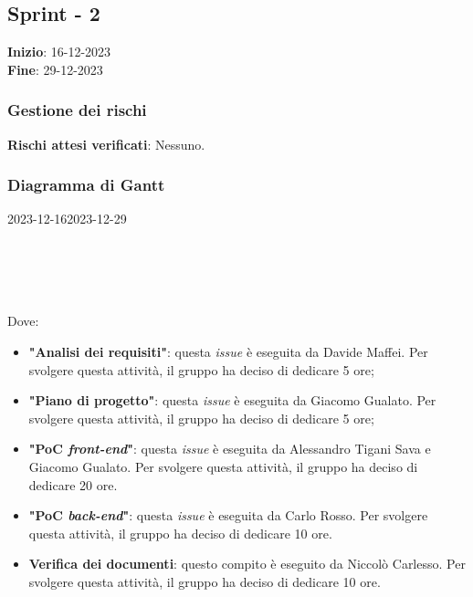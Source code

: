 \subsection{Sprint - 2}
\textbf{Inizio}: 16-12-2023 \\
\textbf{Fine}: 29-12-2023

\subsubsection{Gestione dei rischi}
\textbf{Rischi attesi verificati}: Nessuno.

\subsubsection{Diagramma di Gantt}

\begin{ganttchart}[
		x unit=0.6cm, %
		y unit chart=0.6cm,
		bar/.style={fill=blue!50},
		bar height=0.5,
		time slot format=isodate,
		time slot unit=day,
		vgrid,
		today=2023-12-16,
		today rule/.style={draw=red, ultra thick}
	]{2023-12-16}{2023-12-29}
	 \\
	 \\
	 \\
	 \\
	 \\
\end{ganttchart}

Dove:
\begin{itemize}
	\item \textbf{"Analisi dei requisiti"}: questa \textit{issue} è eseguita da
	      Davide Maffei. Per svolgere questa attività, il gruppo ha deciso di
	      dedicare 5 ore;

	\item \textbf{"Piano di progetto"}: questa \textit{issue} è eseguita da
	      Giacomo Gualato. Per svolgere questa attività, il gruppo ha deciso
	      di dedicare 5 ore;

	\item \textbf{"PoC \textit{front-end}"}: questa \textit{issue} è eseguita
	      da Alessandro Tigani Sava e Giacomo Gualato. Per svolgere questa
	      attività, il gruppo ha deciso di dedicare 20 ore.

	\item \textbf{"PoC \textit{back-end}"}: questa \textit{issue} è eseguita
	      da Carlo Rosso. Per svolgere questa attività, il gruppo ha deciso di
	      dedicare 10 ore.

	\item \textbf{Verifica dei documenti}: questo compito è eseguito da
	      Niccolò Carlesso. Per svolgere questa attività, il gruppo ha deciso
	      di dedicare 10 ore.
\end{itemize}

